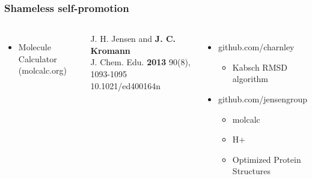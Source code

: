 \documentclass[12pt]{beamer}
\begin{document}
\begin{frame}
    \frametitle{Shameless self-promotion}

    \begin{columns}[t]


            \begin{itemize}

                \item Molecule Calculator (molcalc.org)

            \end{itemize}

            {\scriptsize
                J. H. Jensen and {\bf J. C. Kromann}\\
                J. Chem. Edu.
                {\bf 2013}
                90(8), 1093-1095
                10.1021/ed400164n

            }



            \begin{itemize}

                \item github.com/charnley

                \begin{itemize}

                    \item Kabsch RMSD algorithm

                \end{itemize}

                \item github.com/jensengroup

                \begin{itemize}

                    \item molcalc

                    \item H+

                    \item Optimized Protein Structures

                \end{itemize}


            \end{itemize}


    \end{columns}

\end{frame}
\end{document}
